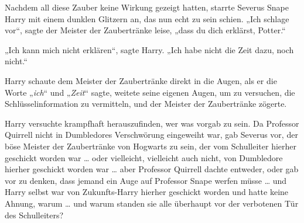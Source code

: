 Nachdem all diese Zauber keine Wirkung gezeigt hatten, starrte Severus Snape Harry mit einem dunklen Glitzern an, das nun echt zu sein schien.
„Ich schlage vor“, sagte der Meister der Zaubertränke leise, „dass du dich erklärst, Potter.“

„Ich kann mich nicht erklären“, sagte Harry.
„Ich habe nicht die Zeit dazu, noch nicht.“

Harry schaute dem Meister der Zaubertränke direkt in die Augen, als er die Worte
„\emph{ich}“ und
„\emph{Zeit}“ sagte, weitete seine eigenen Augen, um zu versuchen, die Schlüsselinformation zu vermitteln, und der Meister der Zaubertränke zögerte.

Harry versuchte krampfhaft herauszufinden, wer was vorgab zu sein. Da Professor Quirrell nicht in Dumbledores Verschwörung eingeweiht war, gab Severus vor, der böse Meister der Zaubertränke von Hogwarts zu sein, der vom Schulleiter hierher geschickt worden war … oder vielleicht, vielleicht auch nicht, von Dumbledore hierher geschickt worden war … aber Professor Quirrell dachte entweder, oder gab vor zu denken, dass jemand ein Auge auf Professor Snape werfen müsse … und Harry selbst war von Zukunfts-Harry hierher geschickt worden und hatte keine Ahnung, warum … und warum standen sie alle überhaupt vor der verbotenen Tür des Schulleiters?



